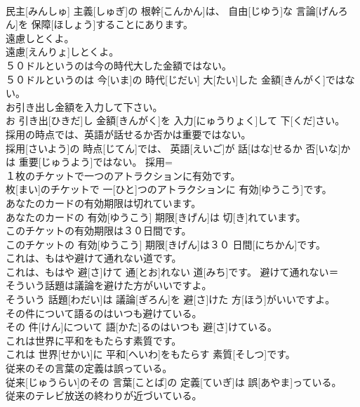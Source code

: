 \documentclass[8pt]{extreport}
\begin{document}
\begin{CJK}{UTF8}{min}
\\	民主[みんしゅ] 主義[しゅぎ]の 根幹[こんかん]は、 自由[じゆう]な 言論[げんろん]を 保障[ほしょう]することにあります。	
\\	遠慮しとくよ。	
\\	遠慮[えんりょ]しとくよ。	
\\	５０ドルというのは今の時代大した金額ではない。	
\\	５０ドルというのは 今[いま]の 時代[じだい] 大[たい]した 金額[きんがく]ではない。	
\\	お引き出し金額を入力して下さい。	
\\	お 引き出[ひきだ]し 金額[きんがく]を 入力[にゅうりょく]して 下[くだ]さい。	
\\	採用の時点では、英語が話せるか否かは重要ではない。	
\\	採用[さいよう]の 時点[じてん]では、 英語[えいご]が 話[はな]せるか 否[いな]かは 重要[じゅうよう]ではない。	採用= 
\\	１枚のチケットで一つのアトラクションに有効です。	
\\	枚[まい]のチケットで 一[ひと]つのアトラクションに 有効[ゆうこう]です。	
\\	あなたのカードの有効期限は切れています。	
\\	あなたのカードの 有効[ゆうこう] 期限[きげん]は 切[き]れています。	
\\	このチケットの有効期限は３０日間です。	
\\	このチケットの 有効[ゆうこう] 期限[きげん]は３０ 日間[にちかん]です。	
\\	これは、もはや避けて通れない道です。	
\\	これは、もはや 避[さ]けて 通[とお]れない 道[みち]です。	避けて通れない＝ 
\\	そういう話題は議論を避けた方がいいですよ。	
\\	そういう 話題[わだい]は 議論[ぎろん]を 避[さ]けた 方[ほう]がいいですよ。	
\\	その件について語るのはいつも避けている。	
\\	その 件[けん]について 語[かた]るのはいつも 避[さ]けている。	
\\	これは世界に平和をもたらす素質です。	
\\	これは 世界[せかい]に 平和[へいわ]をもたらす 素質[そしつ]です。	
\\	従来のその言葉の定義は誤っている。	
\\	従来[じゅうらい]のその 言葉[ことば]の 定義[ていぎ]は 誤[あやま]っている。	
\\	従来のテレビ放送の終わりが近づいている。	

\end{CJK}
\end{document}
